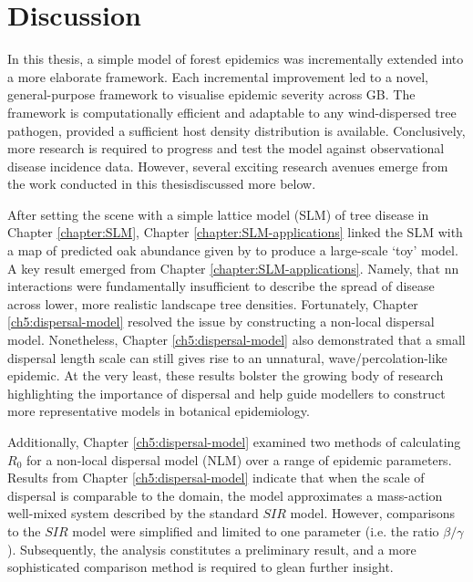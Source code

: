 
\chapter{Discussion}

In this thesis, a simple model of forest epidemics was incrementally extended into a more elaborate framework.
Each incremental improvement led to a novel, general-purpose framework to visualise epidemic severity across GB.
The framework is computationally efficient and adaptable to any wind-dispersed tree pathogen, provided a sufficient host density distribution is available. Conclusively, more research is required to progress and test the model against observational disease incidence data.
However, several exciting research avenues emerge from the work conducted in this thesis\textemdash discussed more below.

After setting the scene with a simple lattice model (SLM) of tree disease in Chapter \ref{chapter:SLM}, 
Chapter \ref{chapter:SLM-applications} linked the SLM with a map of predicted oak abundance given by \cite{hill.data} to produce a large-scale `toy' model. 
A key result emerged from Chapter \ref{chapter:SLM-applications}.
Namely, that \acrshort{nn} interactions were fundamentally insufficient to describe the spread of disease across lower, more realistic landscape tree densities. 
Fortunately, Chapter \ref{ch5:dispersal-model} resolved the issue by constructing a non-local dispersal model.
Nonetheless, Chapter \ref{ch5:dispersal-model} also demonstrated that a small dispersal length scale can still gives rise to an unnatural, wave/percolation-like epidemic. 
At the very least, these results bolster the growing body of research highlighting the importance of dispersal and help guide modellers to construct more representative models in botanical epidemiology.

Additionally, Chapter \ref{ch5:dispersal-model} examined two methods of calculating $R_0$ for a non-local dispersal model (NLM) over a range of epidemic parameters. Results from Chapter \ref{ch5:dispersal-model} indicate that when the scale of dispersal is comparable to the domain, the model approximates a mass-action well-mixed system described by the standard $SIR$ model. However, comparisons to the $SIR$ model were simplified and limited to one parameter (i.e. the ratio $\beta/\gamma$). Subsequently, the analysis constitutes a preliminary result, and a more sophisticated comparison method is required to glean further insight.

